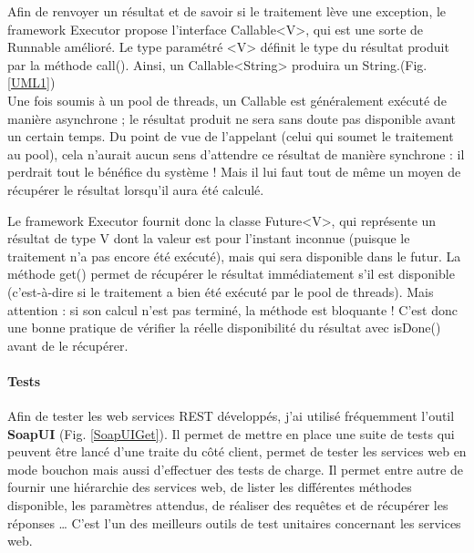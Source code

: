 \begin{itemize}
Afin de renvoyer un résultat et de savoir si le traitement lève une exception, le framework \og Executor \fg propose l'interface Callable<V>, qui est une sorte de Runnable amélioré. Le type paramétré <V> définit le type du résultat produit par la méthode call(). Ainsi, un Callable<String> produira un String.(Fig. \ref{UML1})\\

Une fois soumis à un pool de threads, un Callable est généralement exécuté de manière asynchrone ; le résultat produit ne sera sans doute pas disponible avant un certain temps.
Du point de vue de l'appelant (celui qui soumet le traitement au pool), cela n'aurait aucun sens d'attendre ce résultat de manière synchrone : il perdrait tout le bénéfice du système ! Mais il lui faut tout de même un moyen de récupérer le résultat lorsqu'il aura été calculé.

Le framework \og Executor \fg fournit donc la classe Future<V>, qui représente un résultat de type V dont la valeur est pour l'instant inconnue (puisque le traitement n'a pas encore été exécuté), mais qui sera disponible dans le futur. 
La méthode get() permet de récupérer le résultat immédiatement s'il est disponible (c'est-à-dire si le traitement a bien été exécuté par le pool de threads). Mais attention : si son calcul n'est pas terminé, la méthode est bloquante ! C'est donc une bonne pratique de vérifier la réelle disponibilité du résultat avec isDone() avant de le récupérer. \\



\paragraph{Tests}

Afin de tester les web services REST développés, j'ai utilisé fréquemment l'outil \textbf{SoapUI} (Fig. \ref{SoapUIGet}). Il permet de mettre en place une suite de tests qui peuvent être lancé d'une traite du côté client, permet de tester les services web en mode bouchon mais aussi d'effectuer des tests de charge. Il permet entre autre de fournir une hiérarchie des services web, de lister les différentes méthodes disponible, les paramètres attendus, de réaliser des requêtes et de récupérer les réponses … C'est l'un des meilleurs outils de test unitaires concernant les services web.\\


\end{itemize}
